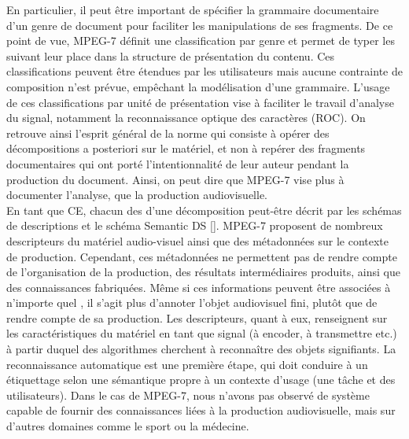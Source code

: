 En particulier, il peut être important de spécifier la grammaire documentaire d'un genre de document pour faciliter les manipulations de ses fragments. 
De ce point de vue, MPEG-7 définit une classification par genre et permet de typer les  suivant leur place dans la structure de présentation du contenu.
Ces classifications peuvent être étendues par les utilisateurs mais aucune contrainte de composition n'est prévue, empêchant la modélisation d'une grammaire.
L'usage de ces classifications par unité de présentation vise à faciliter le travail d'analyse du signal, notamment la reconnaissance optique des caractères (ROC).
On retrouve ainsi l'esprit général de la norme qui consiste à opérer des décompositions a posteriori sur le matériel, et non à repérer des fragments documentaires qui ont porté l'intentionnalité de leur auteur pendant la production du document.
Ainsi, on peut dire que MPEG-7 vise plus à documenter l'analyse, que la production audiovisuelle.\\


En tant que CE, chacun des  d'une décomposition peut-être décrit par les schémas de descriptions et le schéma Semantic DS [].
MPEG-7 proposent de nombreux descripteurs du matériel audio-visuel ainsi que des métadonnées sur le contexte de production.
Cependant, ces métadonnées ne permettent pas de rendre compte de l'organisation de la production, des résultats intermédiaires produits, ainsi que des connaissances fabriquées. 
Même si ces informations peuvent être associées à n'importe quel , il s'agit plus d'annoter l'objet audiovisuel fini, plutôt que de rendre compte de sa production.
Les descripteurs, quant à eux, renseignent sur les caractéristiques du matériel en tant que signal (à encoder, à transmettre etc.) à partir duquel des algorithmes cherchent à reconnaître des objets signifiants.
La reconnaissance automatique est une première étape, qui doit conduire à un étiquettage selon une sémantique propre à un contexte d'usage (une tâche et des utilisateurs).
Dans le cas de MPEG-7, nous n'avons pas observé de système capable de fournir des connaissances liées à la production audiovisuelle, mais sur d'autres domaines comme le sport ou la médecine.

